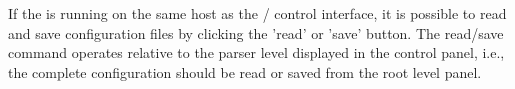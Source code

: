 If the \mha{} is running on the same host as the \Octave{}/ \Matlab{} control
interface, it is possible to read and save \mha{} configuration files by
clicking the 'read' or 'save' button. The read/save command operates
relative to the \mha{} parser level displayed in the control panel, i.e.,
the complete configuration should be read or saved from the root level
panel.


